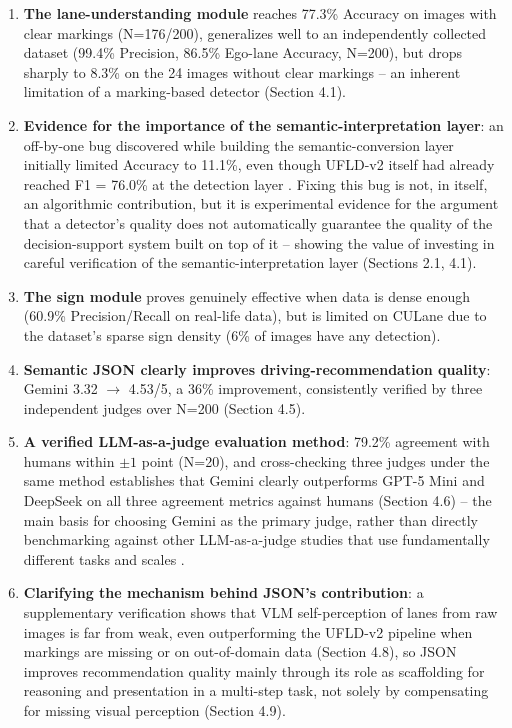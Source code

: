 \documentclass[12pt,a4paper]{report}
\begin{document}
\begin{enumerate}
    \item \textbf{The lane-understanding module} reaches 77.3\% Accuracy on images with clear markings (N=176/200), generalizes well to an independently collected dataset (99.4\% Precision, 86.5\% Ego-lane Accuracy, N=200), but drops sharply to 8.3\% on the 24 images without clear markings -- an inherent limitation of a marking-based detector (Section 4.1).
    \item \textbf{Evidence for the importance of the semantic-interpretation layer}: an off-by-one bug discovered while building the semantic-conversion layer initially limited Accuracy to 11.1\%, even though UFLD-v2 itself had already reached F1 = 76.0\% at the detection layer \cite{qin2022ufldv2}. Fixing this bug is not, in itself, an algorithmic contribution, but it is experimental evidence for the argument that a detector's quality does not automatically guarantee the quality of the decision-support system built on top of it -- showing the value of investing in careful verification of the semantic-interpretation layer (Sections 2.1, 4.1).
    \item \textbf{The sign module} proves genuinely effective when data is dense enough (60.9\% Precision/Recall on real-life data), but is limited on CULane due to the dataset's sparse sign density (6\% of images have any detection).
    \item \textbf{Semantic JSON clearly improves driving-recommendation quality}: Gemini 3.32 $\rightarrow$ 4.53/5, a 36\% improvement, consistently verified by three independent judges over N=200 (Section 4.5).
    \item \textbf{A verified LLM-as-a-judge evaluation method}: 79.2\% agreement with humans within $\pm 1$ point (N=20), and cross-checking three judges under the same method establishes that Gemini clearly outperforms GPT-5 Mini and DeepSeek on all three agreement metrics against humans (Section 4.6) -- the main basis for choosing Gemini as the primary judge, rather than directly benchmarking against other LLM-as-a-judge studies that use fundamentally different tasks and scales \cite{zheng2023mtbench}.
    \item \textbf{Clarifying the mechanism behind JSON's contribution}: a supplementary verification shows that VLM self-perception of lanes from raw images is far from weak, even outperforming the UFLD-v2 pipeline when markings are missing or on out-of-domain data (Section 4.8), so JSON improves recommendation quality mainly through its role as scaffolding for reasoning and presentation in a multi-step task, not solely by compensating for missing visual perception (Section 4.9).
\end{enumerate}
\end{document}
